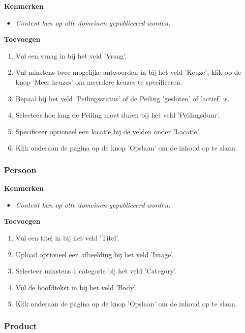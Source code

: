 \textbf{Kenmerken}

\begin{itemize}
\item \emph{Content kan op alle domeinen gepubliceerd worden.}
\end{itemize}

\textbf{Toevoegen}

\begin{enumerate}
\item Vul een vraag in bij het veld 'Vraag'.
\item Vul minstens twee mogelijke antwoorden in bij het veld 'Keuze', klik op de knop 'Meer keuzes' om meerdere keuzes te specificeren.
\item Bepaal bij het veld 'Peilingsstatus' of de Peiling 'gesloten' of 'actief' is.
\item Selecteer hoe lang de Peiling moet duren bij het veld 'Peilingsduur'.
\item Specificeer optioneel een locatie bij de velden onder 'Locatie'.
\item Klik onderaan de pagina op de knop 'Opslaan' om de inhoud op te slaan.
\end{enumerate}

\subsubsection{Persoon}\label{persoon}

\textbf{Kenmerken}

\begin{itemize}
\item \emph{Content kan op alle domeinen gepubliceerd worden.}
\end{itemize}

\textbf{Toevoegen}

\begin{enumerate}
\item Vul een titel in bij het veld 'Titel'.
\item Upload optioneel een afbeelding bij het veld 'Image'.
\item Selecteer minstens 1 categorie bij het veld 'Category'.
\item Vul de hoofdtekst in bij het veld 'Body'.
\item Klik onderaan de pagina op de knop 'Opslaan' om de inhoud op te slaan.
\end{enumerate}

\subsubsection{Product}\label{product}

